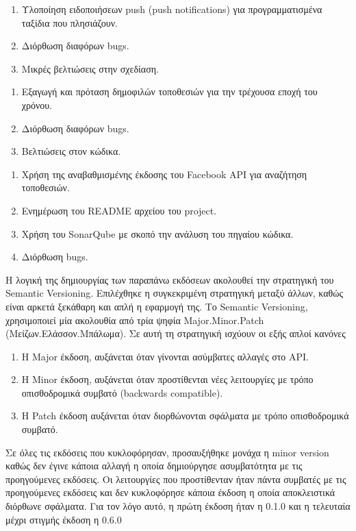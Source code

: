 \documentclass[oneside, 12pt]{book}
\begin{document}
{\large \color{blue}{TripAssistant 0.4.0}}
\begin{enumerate}
    \item Υλοποίηση ειδοποιήσεων push (push notifications) για προγραμματισμένα ταξίδια που πλησιάζουν.
    \item Διόρθωση διαφόρων bugs.
    \item Μικρές βελτιώσεις στην σχεδίαση.
\end{enumerate}

{\large \color{blue}{TripAssistant 0.5.0}}
\begin{enumerate}
    \item Εξαγωγή και πρόταση δημοφιλών τοποθεσιών για την τρέχουσα εποχή του χρόνου.
    \item Διόρθωση διαφόρων bugs.
    \item Βελτιώσεις στον κώδικα.
\end{enumerate}

{\large \color{blue}{TripAssistant 0.6.0}}
\begin{enumerate}
    \item Χρήση της αναβαθμισμένης έκδοσης του Facebook API για αναζήτηση τοποθεσιών.
    \item Ενημέρωση του README αρχείου του project.
    \item Χρήση του SonarQube με σκοπό την ανάλυση του πηγαίου κώδικα.
    \item Διόρθωση bugs.
\end{enumerate}

Η λογική της δημιουργίας των παραπάνω εκδόσεων ακολουθεί την 
στρατηγική του Semantic Versioning. Επιλέχθηκε η συγκεκριμένη 
στρατηγική μεταξύ άλλων, καθώς είναι αρκετά ξεκάθαρη και απλή η 
εφαρμογή της.
Το Semantic Versioning, χρησιμοποιεί μία ακολουθία από τρία ψηφία Major.Minor.Patch (Μείζων.Ελάσσον.Μπάλωμα).
Σε αυτή τη στρατηγική ισχύουν οι εξής απλοί κανόνες
\begin{enumerate}
    \item Η Major έκδοση, αυξάνεται όταν γίνονται ασύμβατες αλλαγές στο API. 
    \item Η Minor έκδοση, αυξάνεται όταν προστίθενται νέες λειτουργίες με τρόπο οπισθοδρομικά συμβατό (backwards compatible).
    \item Η Patch έκδοση αυξάνεται όταν διορθώνονται σφάλματα με τρόπο οπισθοδρομικά συμβατό.
\end{enumerate}
\cite{preston2013semantic}

Σε όλες τις εκδόσεις που κυκλοφόρησαν, προσαυξήθηκε μονάχα η minor version 
καθώς δεν έγινε κάποια αλλαγή η οποία δημιούργησε ασυμβατότητα με 
τις προηγούμενες εκδόσεις.
Οι λειτουργίες που προστίθενταν ήταν πάντα συμβατές με τις 
προηγούμενες εκδόσεις και δεν κυκλοφόρησε κάποια έκδοση η οποία 
αποκλειστικά διόρθωνε σφάλματα.
Για τον λόγο αυτό, η πρώτη έκδοση ήταν η 0.1.0 και η τελευταία μέχρι 
στιγμής έκδοση η 0.6.0
\end{document}
